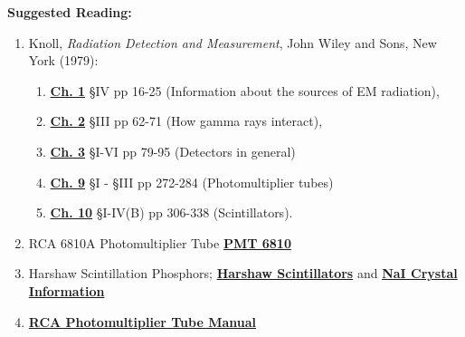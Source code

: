 \documentclass{../lab}
\begin{document}
\noindent\textbf{Suggested Reading:}

\begin{enumerate}
    \item Knoll, \emph{Radiation Detection and Measurement}, John Wiley and Sons, New York (1979):
    \begin{enumerate}
        \item \href{http://physics111.lib.berkeley.edu/Physics111/Reprints/GMA/01-Radiation\_Detection\_and\_Measurement\_CH\_01.pdf}{\textbf{Ch. 1}} \S IV pp 16-25 (Information about the sources of EM radiation),
        
        \item \href{http://physics111.lib.berkeley.edu/Physics111/Reprints/GMA/01-Radiation\_Detection\_and\_Measurement\_CH\_02.pdf}{\textbf{Ch. 2}} \S III pp 62-71 (How gamma rays interact),
        
        \item \href{http://physics111.lib.berkeley.edu/Physics111/Reprints/GMA/01-Radiation\_Detection\_and\_Measurement\_CH\_03.pdf}{\textbf{Ch. 3}} \S I-VI pp 79-95 (Detectors in general)
        
        \item \href{http://physics111.lib.berkeley.edu/Physics111/Reprints/GMA/01-Radiation\_Detection\_and\_Measurement\_CH\_09.pdf}{\textbf{Ch. 9}} \S I - \S III pp 272-284 (Photomultiplier tubes)
        
        \item \href{http://physics111.lib.berkeley.edu/Physics111/Reprints/GMA/01-Radiation\_Detection\_and\_Measurement\_CH\_10.pdf}{\textbf{Ch. 10}} \S I-IV(B) pp 306-338 (Scintillators).
    \end{enumerate}
    
    \item RCA 6810A Photomultiplier Tube \href{http://physics111.lib.berkeley.edu/Physics111/Reprints/GMA/OCR\%20RCA\%206810A\%20photomultiplier\%20tube.pdf}{\textbf{PMT 6810}}

    \item Harshaw Scintillation Phosphors; \href{http://physics111.lib.berkeley.edu/Physics111/Reprints/GMA/Harshaw\%20scintillation\%20phosphors.pdf}{\textbf{Harshaw Scintillators}} and \href{http://experimentationlab.berkeley.edu/sites/default/files/pdfs/Nal\_Crystal\_Information.pdf}{\textbf{NaI Crystal Information}}
    
    \item \href{http://physics111.lib.berkeley.edu/Physics111/Reprints/GMA/RCA\%20PMT.pdf}{\textbf{RCA Photomultiplier Tube Manual}}
    
\end{enumerate}
\end{document}

